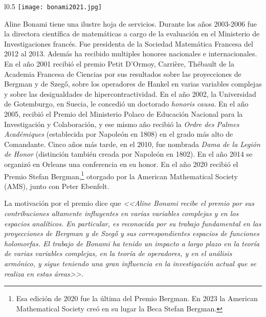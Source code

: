 \documentclass[autocontact]{gaceta}
\begin{document}
\begin{wrapfigure}{l}{0.5\textwidth}
\centering
\texttt{[image: bonami2021.jpg]}
\end{wrapfigure}
Aline Bonami tiene una ilustre hoja de servicios. Durante los años 2003-2006 fue la directora científica de matemáticas a cargo de la evaluación en el Ministerio de Investigaciones francés. Fue presidenta de la Sociedad Matemática Francesa del 2012 al 2013. Además ha recibido multiples honores nacionales e internacionales. En el año 2001 recibió el premio Petit D'Ormoy, Carrière, Thébault de la Academia Francesa de Ciencias por sus resultados sobre las proyecciones de Bergman y de Szeg\H{o}, sobre los operadores de Hankel en varias variables complejas y sobre las desigualdades de hipercontractividad. En el año 2002, la Universidad de Gotemburgo, en Suecia, le concedió un doctorado \emph{honoris causa}.
En el año 2005, recibió el Premio del Ministerio Polaco de Educación Nacional para la Investigación y Colaboración, y ese mismo año recibió la \emph{Ordre des Palmes Académiques} (establecida por Napoleón en 1808) en el grado más alto de Comandante. Cinco años más tarde, en el 2010, fue nombrada \emph{Dama de la Legión de Honor} (distinción también creada por Napoleón en 1802). En el año 2014 se organizó en Orleans una conferencia en su honor. En el año 2020 recibió el Premio Stefan Bergman,\footnote{Esa edición de 2020 fue la última del Premio Bergman. En 2023 la American Mathematical Society creó en su lugar la Beca Stefan Bergman.} otorgado por la American Mathematical Society (AMS), junto con Peter Ebenfelt.

La motivación por el premio dice que \emph{<<Aline Bonami recibe el premio por sus contribuciones altamente influyentes en varias variables complejas y en los espacios analíticos. En particular, es reconocida por su trabajo fundamental en las proyecciones de Bergman y de Szeg\H{o} y sus correspondientes espacios de funciones holomorfas. El trabajo de Bonami ha tenido un impacto a largo plazo en la teoría de varias variables complejas, en la teoría de operadores, y en el análisis armónico, y sigue teniendo una gran influencia en la investigación actual que se realiza en estas áreas>>}.%
\end{document}

